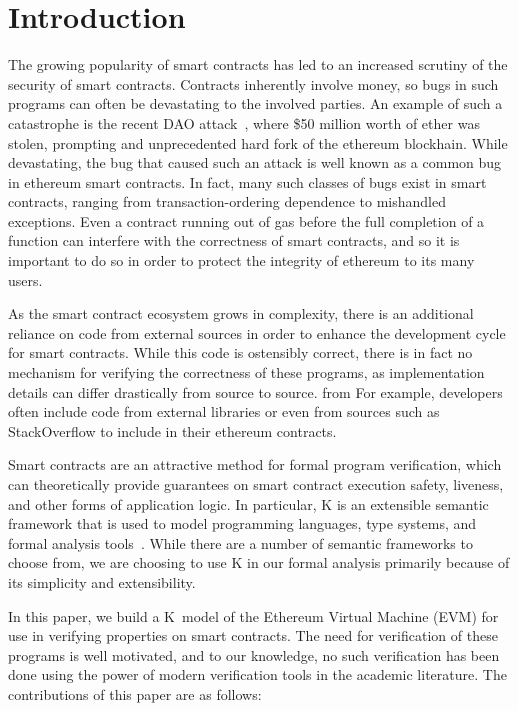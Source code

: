 \section{Introduction}
The growing popularity of smart contracts has led to an increased scrutiny of
the security of smart contracts. Contracts inherently involve money, so bugs in
such programs can often be devastating to the involved parties. An example of
such a catastrophe is the recent DAO attack~\cite{dao-attack}, where \$50
million worth of ether was stolen, prompting and unprecedented hard fork of the
ethereum blockhain. While devastating, the bug that caused such an attack is
well known as a common bug in ethereum smart contracts. In fact, many such
classes of bugs exist in smart contracts, ranging from transaction-ordering
dependence to mishandled exceptions. Even a contract running out of gas before
the full completion of a function can interfere with the correctness of smart
contracts, and so it is important to do so in order to protect the integrity of
ethereum to its many users.

As the smart contract ecosystem grows in complexity, there is an additional
reliance on code from external sources in order to enhance the development cycle
for smart contracts. While this code is ostensibly correct, there is in fact no
mechanism for verifying the correctness of these programs, as implementation
details can differ drastically from source to source. from For example,
developers often include code from external libraries or even from sources such as
StackOverflow to include in their ethereum contracts.

Smart contracts are an attractive method for formal program verification, which
can theoretically provide guarantees on smart contract execution safety,
liveness, and other forms of application logic. In particular, K is an
extensible semantic framework that is used to model programming languages, type
systems, and formal analysis tools~\cite{rosu-serbanuta-2010-jlap}. While there
are a number of semantic frameworks to choose from, we are choosing to use K in
our formal analysis primarily because of its simplicity and extensibility.

In this paper, we build a K~model of the Ethereum Virtual Machine (EVM) for use
in verifying properties on smart contracts. The need for verification of these
programs is well motivated, and to our knowledge, no such verification has been
done using the power of modern verification tools in the academic literature.
The contributions of this paper are as follows:

